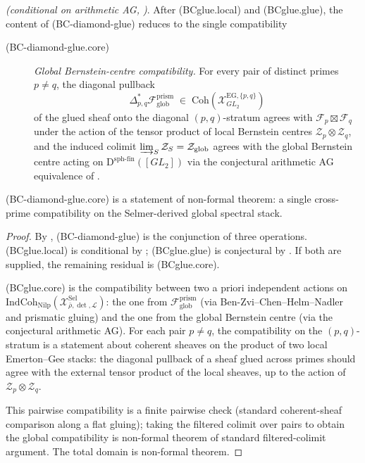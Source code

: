 \begin{theorem}
\label{v4-arith:bcglue-k5:thm:core-compatibility}
\ClaimStatusConjectured \emph{(conditional on arithmetic AG,
)}. After (BCglue.local) and
(BCglue.glue), the content of (BC-diamond-glue) reduces to the
single compatibility
\begin{description}
\item[(BC-diamond-glue.core)] \emph{Global Bernstein-centre
compatibility.} For every pair of distinct primes \(p\neq q\), the
diagonal pullback
\[
\Delta^{*}_{p,q}\mathcal{F}_{\mathrm{glob}}^{\mathrm{prism}}\;\in\;\mathrm{Coh}(\mathcal{X}^{\mathrm{EG},\{p,q\}}_{GL_{2}})
\]
of the glued sheaf onto the diagonal \((p,q)\)-stratum agrees with
\(\mathcal{F}_{p}\boxtimes\mathcal{F}_{q}\) under the action of the
tensor product of local Bernstein centres
\(\mathcal{Z}_{p}\otimes\mathcal{Z}_{q}\), and the induced
colimit
\(\varinjlim_{S}\mathcal{Z}_{S}=\mathcal{Z}_{\mathrm{glob}}\) agrees
with the global Bernstein centre acting on
\(\mathrm{D}^{\mathrm{sph\text{-}fin}}([GL_{2}])\) via the conjectural
arithmetic AG equivalence of .
\end{description}
(BC-diamond-glue.core) is a statement of non-formal theorem: a
single cross-prime compatibility on the Selmer-derived global spectral stack.
\end{theorem}

\begin{proof}
By , (BC-diamond-glue)
is the conjunction of three operations. (BCglue.local) is
conditional by ;
(BCglue.glue) is conjectural by
. If both are supplied,
the remaining residual is (BCglue.core).

(BCglue.core) is the compatibility between two a priori independent
actions on \(\mathrm{IndCoh}_{\mathrm{Nilp}}(\mathcal{X}^{\mathrm{Sel}}_{\bar\rho,\det,\mathcal{L}})\):
the one from \(\mathcal{F}_{\mathrm{glob}}^{\mathrm{prism}}\) (via
Ben-Zvi--Chen--Helm--Nadler and prismatic gluing) and the one from the global Bernstein
centre (via the conjectural arithmetic AG). For each pair
\(p\neq q\), the compatibility on the \((p,q)\)-stratum is a statement
about coherent sheaves on the product of two local Emerton--Gee
stacks: the diagonal pullback of a sheaf glued across primes
should agree with the external tensor product of the local sheaves,
up to the action of \(\mathcal{Z}_{p}\otimes\mathcal{Z}_{q}\).

This pairwise compatibility is a finite pairwise check (standard
coherent-sheaf comparison along a flat gluing); taking the
filtered colimit over pairs to obtain the global compatibility is
non-formal theorem of standard filtered-colimit argument. The total
domain is non-formal theorem.
\end{proof}

